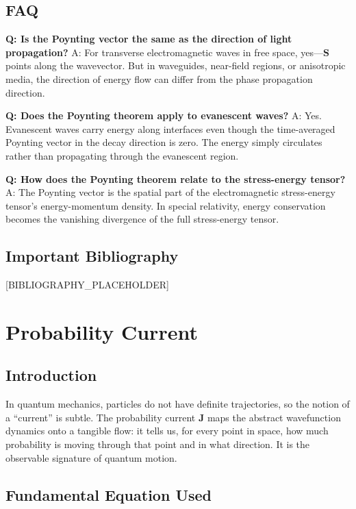 \documentclass[11pt,openright]{book}
\begin{document}
\section*{FAQ}

\textbf{Q: Is the Poynting vector the same as the direction of light propagation?}
A: For transverse electromagnetic waves in free space, yes---$\mathbf{S}$ points along the wavevector. But in waveguides, near-field regions, or anisotropic media, the direction of energy flow can differ from the phase propagation direction.

\textbf{Q: Does the Poynting theorem apply to evanescent waves?}
A: Yes. Evanescent waves carry energy along interfaces even though the time-averaged Poynting vector in the decay direction is zero. The energy simply circulates rather than propagating through the evanescent region.

\textbf{Q: How does the Poynting theorem relate to the stress-energy tensor?}
A: The Poynting vector is the spatial part of the electromagnetic stress-energy tensor's energy-momentum density. In special relativity, energy conservation becomes the vanishing divergence of the full stress-energy tensor.
\section*{Important Bibliography}

[BIBLIOGRAPHY_PLACEHOLDER]


\chapter{Probability Current}

\section*{Introduction}

In quantum mechanics, particles do not have definite trajectories, so the notion of a ``current'' is subtle. The probability current $\mathbf{J}$ maps the abstract wavefunction dynamics onto a tangible flow: it tells us, for every point in space, how much probability is moving through that point and in what direction. It is the observable signature of quantum motion.
\section*{Fundamental Equation Used}
\end{document}
